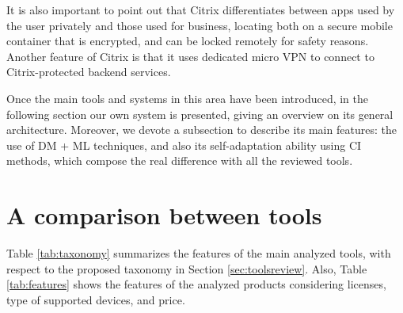 It is also important to point out that Citrix differentiates between apps used by the user privately and those used for business, locating both on a secure mobile container that is encrypted, and can be locked remotely for safety reasons. Another feature of Citrix is that it uses dedicated micro VPN to connect to Citrix-protected backend services.

Once the main tools and systems in this area have been introduced, in the following section our own system is presented, giving an overview on its general architecture. Moreover, we devote a subsection to describe its main features: the use of DM + ML techniques, and also its self-adaptation ability using CI methods, which compose the real difference with all the reviewed tools. 

\section{A comparison between tools}
\label{sec:comparison}

Table \ref{tab:taxonomy} summarizes the features of the main analyzed tools, with respect to the proposed taxonomy in Section \ref{sec:toolsreview}. Also, Table \ref{tab:features} shows the features of the analyzed products considering licenses, type of supported devices, and price.


